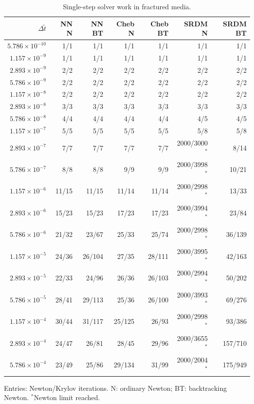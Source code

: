 \begin{table}[htbp]\centering\scriptsize
\caption{Single-step solver work in fractured media.}\label{tab:si-current-edfm-single}
\setlength{\tabcolsep}{4pt}
\begin{tabular}{rrrrrrr}\toprule
$\Delta\tilde t$ & NN N & NN BT & Cheb N & Cheb BT & SRDM N & SRDM BT\\\midrule
$5.786\times10^{-10}$ & 1/1 & 1/1 & 1/1 & 1/1 & 1/1 & 1/1 \\
$1.157\times10^{-9}$ & 1/1 & 1/1 & 1/1 & 1/1 & 1/1 & 1/1 \\
$2.893\times10^{-9}$ & 2/2 & 2/2 & 2/2 & 2/2 & 2/2 & 2/2 \\
$5.786\times10^{-9}$ & 2/2 & 2/2 & 2/2 & 2/2 & 2/2 & 2/2 \\
$1.157\times10^{-8}$ & 2/2 & 2/2 & 2/2 & 2/2 & 2/2 & 2/2 \\
$2.893\times10^{-8}$ & 3/3 & 3/3 & 3/3 & 3/3 & 3/3 & 3/3 \\
$5.786\times10^{-8}$ & 4/4 & 4/4 & 4/4 & 4/4 & 4/5 & 4/5 \\
$1.157\times10^{-7}$ & 5/5 & 5/5 & 5/5 & 5/5 & 5/8 & 5/8 \\
$2.893\times10^{-7}$ & 7/7 & 7/7 & 7/7 & 7/7 & 2000/3000$^{*}$ & 8/14 \\
$5.786\times10^{-7}$ & 8/8 & 8/8 & 9/9 & 9/9 & 2000/3998$^{*}$ & 10/21 \\
$1.157\times10^{-6}$ & 11/15 & 11/15 & 11/14 & 11/14 & 2000/2998$^{*}$ & 13/33 \\
$2.893\times10^{-6}$ & 15/23 & 15/23 & 17/23 & 17/23 & 2000/3994$^{*}$ & 23/84 \\
$5.786\times10^{-6}$ & 21/32 & 23/67 & 25/33 & 25/74 & 2000/2998$^{*}$ & 36/139 \\
$1.157\times10^{-5}$ & 24/36 & 26/104 & 27/35 & 28/111 & 2000/3995$^{*}$ & 42/163 \\
$2.893\times10^{-5}$ & 22/33 & 24/96 & 26/36 & 26/103 & 2000/2994$^{*}$ & 50/202 \\
$5.786\times10^{-5}$ & 28/41 & 29/113 & 25/36 & 26/100 & 2000/3993$^{*}$ & 69/276 \\
$1.157\times10^{-4}$ & 30/44 & 31/117 & 25/125 & 26/93 & 2000/2998$^{*}$ & 93/386 \\
$2.893\times10^{-4}$ & 24/47 & 26/81 & 28/45 & 29/96 & 2000/3655$^{*}$ & 157/710 \\
$5.786\times10^{-4}$ & 23/49 & 25/86 & 29/134 & 31/99 & 2000/2004$^{*}$ & 175/949 \\
\bottomrule\end{tabular}
\par\smallskip\begin{minipage}{\linewidth}\footnotesize
Entries: Newton/Krylov iterations. N: ordinary Newton; BT: backtracking Newton. $^{*}$Newton limit reached.
\end{minipage}
\end{table}
